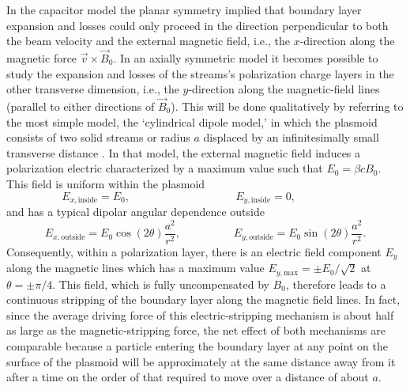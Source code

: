 \documentclass [12pt,a4paper,     ]{report} %
\begin{document}
  In the capacitor model the planar symmetry implied that boundary layer expansion and losses could only proceed in the direction perpendicular to both the beam velocity and the external magnetic field, i.e., the $x$-direction along the magnetic force $\vec{v} \times \vec{B}_0$.  In an axially symmetric model it becomes possible to study the expansion and losses of the streams's polarization charge layers in the other transverse dimension, i.e., the $y$-direction along the magnetic-field lines (parallel to either directions of $\vec{B}_0$).  This will be done qualitatively by referring to the most simple model, the `cylindrical dipole model,' in which the plasmoid consists of two solid streams or radius $a$ displaced by an infinitesimally small transverse distance  \cite{GALVE1991-}.  In that model, the external magnetic field induces a polarization electric characterized by a maximum value such that $E_0 = \beta c B_0$.  This field is uniform within the plasmoid
%
\begin{equation}\label{gau:11} %
   E_{x,\text{inside}} = E_0, \hspace{4cm} E_{y,\text{inside}} = 0, \hspace{2cm}
\end{equation}
%
and has a typical dipolar angular dependence outside
%
\begin{equation}\label{gau:12} %
    E_{x,\text{outside}} = E_0 \cos(2\theta)\frac{a^2}{r^2}, \hspace{2cm}
    E_{y,\text{outside}} = E_0 \sin(2\theta)\frac{a^2}{r^2}.
\end{equation}
%
Consequently, within a polarization layer, there is an electric field component $E_y$ along the magnetic lines which has a maximum value $E_{y,\text{max}} = \pm E_0/\sqrt{2}$ at $\theta=\pm\pi/4$.  This field, which is fully uncompensated by $B_0$, therefore leads to a continuous stripping of the boundary layer along the magnetic field lines.  In fact, since the average driving force of this electric-stripping mechanism is about half as large as the magnetic-stripping force, the net effect of both mechanisms are comparable because a particle entering the boundary layer at any point on the surface of the plasmoid will be approximately at the same distance away from it after a time on the order of that required to move over a distance of about $a$.
\end{document}
